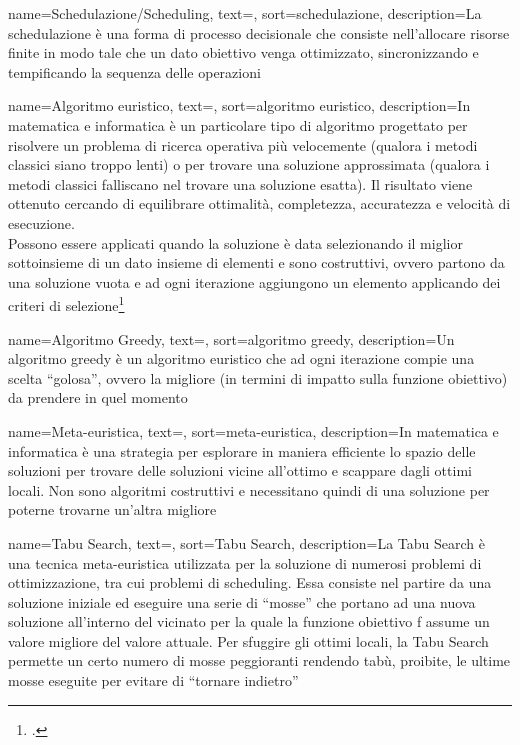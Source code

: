 {
    name=Schedulazione/Scheduling,
    text=,
    sort=schedulazione,
    description={La schedulazione è una forma di processo decisionale che consiste nell'allocare risorse finite in modo tale che un dato obiettivo venga ottimizzato, sincronizzando e tempificando la sequenza delle operazioni}
}

{
    name=Algoritmo euristico,
    text=,
    sort=algoritmo euristico,
    description={In matematica e informatica è un particolare tipo di algoritmo progettato per risolvere un problema di ricerca operativa più velocemente (qualora i metodi classici siano troppo lenti) o per trovare una soluzione approssimata (qualora i metodi classici falliscano nel trovare una soluzione esatta). Il risultato viene ottenuto cercando di equilibrare ottimalità, completezza, accuratezza e velocità di esecuzione. \\
    Possono essere applicati quando la soluzione è data selezionando il miglior sottoinsieme di un dato insieme di elementi e sono costruttivi, ovvero partono da una soluzione vuota e ad ogni iterazione aggiungono un elemento applicando dei criteri di selezione\footcite{degio:dispensa}}
}

{
    name=Algoritmo Greedy,
    text=,
    sort=algoritmo greedy,
    description={Un algoritmo greedy è un algoritmo euristico che ad ogni iterazione compie una scelta ``golosa'', ovvero la migliore (in termini di impatto sulla funzione obiettivo) da prendere in quel momento}
}

{
    name=Meta-euristica,
    text=,
    sort=meta-euristica,
    description={In matematica e informatica è una strategia per esplorare in maniera efficiente lo spazio delle soluzioni per trovare delle soluzioni vicine all'ottimo e scappare dagli ottimi locali. Non sono algoritmi costruttivi e necessitano quindi di una soluzione per poterne trovarne un'altra migliore}
}

{
    name=Tabu Search,
    text=,
    sort=Tabu Search,
    description={La Tabu Search è una tecnica meta-euristica utilizzata per la soluzione di numerosi problemi di ottimizzazione, tra cui problemi di scheduling. Essa consiste nel partire da una soluzione iniziale ed eseguire una serie di ``mosse'' che portano ad una nuova soluzione all'interno del vicinato per la quale la funzione obiettivo f assume un valore migliore del valore attuale. Per sfuggire gli ottimi locali, la Tabu Search permette un certo numero di mosse peggioranti rendendo tabù, proibite, le ultime mosse eseguite per evitare di ``tornare indietro''}
}

